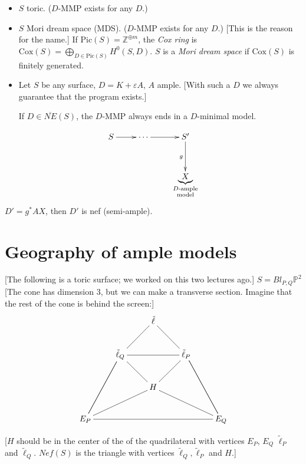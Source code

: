 \begin{itemize}
\item $S$ toric.
($D$-MMP exists for any  $D$.)

\item $S$ Mori dream space (MDS).
($D$-MMP exists for any $D$.)
[This is the reason for the name.]
If $\text{Pic}(S)=\mathbb{Z}^{\oplus m}$,
the {\it Cox ring} is
 $\text{Cox}(S)=\bigoplus_{D \in
 \text{Pic}(S)}H^0(S,D)$.
$S$ is a {\it Mori dream space} if
$\text{Cox}(S)$ is finitely generated.

\item Let $S$ be any surface,
$D=K+\varepsilon A$,
$A$ ample.
[With such a $D$ we always guarantee that the
program exists.]

\begin{remark}
\label{remark-ample}
If $D \in \overline{NE}(S)$,
the $D$-MMP always ends in a $D$-minimal
model.
\end{remark}
\end{itemize}

$$
\xymatrix{
S \ar[r]&\cdots
\ar[r]
&S' \ar[d]_g\\
& &\underbrace{X}_{\substack{\text{$D$-ample}
\\ \text{model}}}
}
$$
$D'=g^*AX$, then
$D'$ is nef (semi-ample).

\medskip{}

\section{Geography of ample models}
\label{section-geography}

\begin{example}
\label{example-toric-surface}
[The following is a toric surface;
we worked on this two lectures ago.]
$S= Bl_{P,Q}\mathbb{P}^2$
[The cone has dimension 3, but we can make a
transverse section.
Imagine that the rest of the cone is behind
the screen:]
$$
\xymatrix{
  &           &  \tilde{\ell}
\ar@{-}[dl]\ar@{-}[dr]\\
  &  \tilde{\ell}_Q\ar@{-}[ddl]
\ar@{-}[dr]\ar@{-}[rr]&  &  \tilde{\ell}_{P}
\ar@{-}[ddr]\ar@{-}[dl]\\
  &                          & H\\
E_P\ar@{-}[urr]\ar@{-}[uur]
\ar@{-}[rrrr]& & & &
E_Q\ar@{-}[ull]\ar@{-}[uul]
}
$$

[$H$ should be in the center of the of the
quadrilateral
with vertices $E_P$,  $E_Q$  $\tilde{\ell}_P$
and $\tilde{\ell}_Q$.
$Nef(S)$ is the triangle with vertices
 $\tilde{\ell}_Q, \tilde{\ell}_P$ and $H$.]
\end{example}

